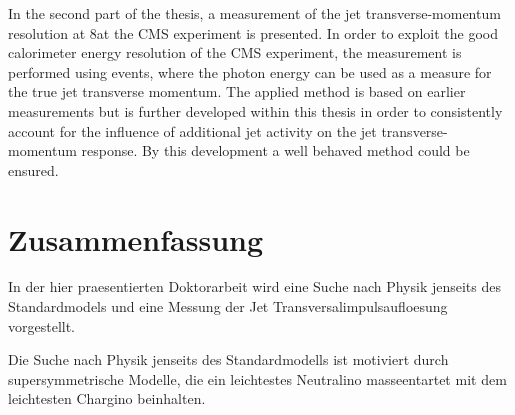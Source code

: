 In the second part of the thesis, a measurement of the jet transverse-momentum resolution at 8\tev at the CMS experiment is presented.
In order to exploit the good calorimeter energy resolution of the CMS experiment, the measurement is performed using \GAMJET events, where the photon energy can be used as a measure for the true jet transverse momentum. 
The applied method is based on earlier measurements but is further developed within this thesis in order to consistently account for the influence of additional jet activity on the jet transverse-momentum response.
By this development a well behaved method could be ensured.

\newpage 
\chapter*{Zusammenfassung}
In der hier praesentierten Doktorarbeit wird eine Suche nach Physik jenseits des Standardmodels und eine Messung der Jet Transversalimpulsaufloesung vorgestellt.

Die Suche nach Physik jenseits des Standardmodells ist motiviert durch supersymmetrische Modelle, die ein leichtestes Neutralino masseentartet mit dem leichtesten Chargino beinhalten.


\cleardoublepage

